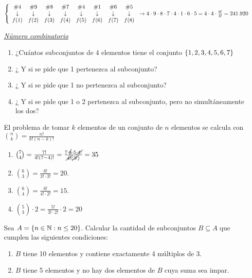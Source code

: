 \documentclass[12pt,a4paper, spanish]{article}
\begin{document}
$\llave{c c c c c c c c}
	{
		\#4 & \#9 & \#8 & \#7 & \#4 & \#1 & \#6 & \#5 \\
		\downarrow & \downarrow & \downarrow &\downarrow & \downarrow & \downarrow &\downarrow &\downarrow\\
		f(1) & f(2) &f(3) &f(4) &f(5) &f(6) & f(7) & f(8)
	}
	\to 4 \cdot 9 \cdot 8 \cdot 7 \cdot 4 \cdot 1 \cdot 6 \cdot 5 = 4 \cdot 4 \cdot \frac{9!}{4!} = 241.920$\\


\separador

{\it \underline{Número combinatorio}}

\ejercicio

\begin{enumerate}[label=\roman*)]
	\item ¿Cuántos subconjuntos de 4 elementos tiene el conjunto $\set{\foreach \i in {1,...,6}{ \i, }7} $
	\item ¿ Y si se pide que 1 pertenezca al subconjunto?
	\item ¿ Y si se pide que 1 no pertenezca al subconjunto?
	\item ¿ Y si se pide que 1 o 2 pertenezca al subconjunto, pero no simultáneamente los dos?
\end{enumerate}

\separadorCorto

El problema de tomar $k$ elementos de un conjunto de $n$ elementos se calcula con $\binom{n}{k} = \frac{n!}{k!(n-k)!}$

\begin{enumerate}[label=\roman*)]
	\item  $\binom{7}{4} = \frac{7!}{4!(7-4)!} = \frac{7\cdot \cancel{6} \cdot 5 \cdot \cancel{4!}}{\cancel{4!}(\cancel{3!})} = 35$

	\item $\binom{6}{3} = \frac{6!}{3!\cdot 3!} = 20$.

	\item $\binom{6}{4} = \frac{6!}{4!\cdot 2!} = 15$.

	\item $\binom{5}{3} \cdot 2 = \frac{5!}{3!\cdot 2!} \cdot 2 = 20$
\end{enumerate}

\ejercicio
Sea $A = \set{n \in \naturales : n \leq 20}$. Calcular la cantidad de subconjuntos $B \subseteq A$ que cumplen las siguientes condiciones:
\begin{enumerate}[label=\roman*)]
	\item $B$ tiene 10 elementos y contiene exactamente 4 múltiplos de 3.
	\item $B$ tiene 5 elementos y no hay dos elementos de $B$ cuya suma sea impar.
\end{enumerate}
\end{document}
